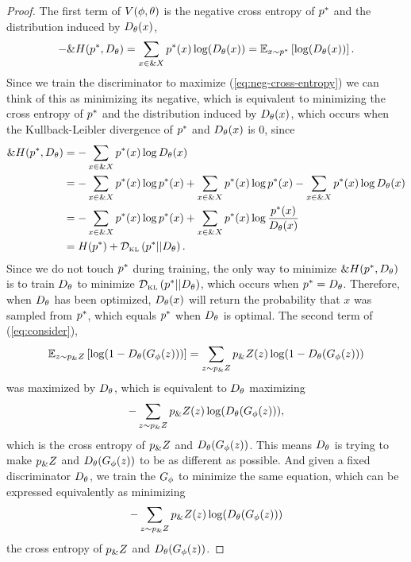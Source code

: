\begin{proof}
  The first term of $V(\phi, \theta)$ is the negative cross entropy of $p^*$ and
  the distribution induced by $D_\theta(x)$,
\begin{align}
  \label{eq:neg-cross-entropy}
  - \&H(p^*, D_\theta) = \sum_{x \in \&X}p^*(x)\log(D_\theta(x)) = \mathbb{E}_{x \sim p^*} \left[\log(D_\theta(x))\right].
\end{align}
Since we train the discriminator to maximize
(\ref{eq:neg-cross-entropy}) we can think of this as minimizing its
negative, which is equivalent to minimizing the cross entropy of $p^*$
and the distribution induced by $D_\theta(x)$, which occurs when the
Kullback-Leibler divergence of $p^*$ and $D_\theta(x)$ is 0, since
\begin{align}
  \&H(p^*,D_\theta) & = - \sum_{x \in \&X} p^*(x) \log D_\theta(x) \\
                   & = -\sum_{x \in \&X} p^*(x) \log p^*(x) + \sum_{x \in \&X} p^*(x) \log p^*(x) - \sum_{x \in \&X} p^*(x) \log D_\theta(x) \\
                   & = -\sum_{x \in \&X} p^*(x) \log p^*(x) + \sum_{x \in \&X} p^*(x) \log {p^*(x)\over
                     D_\theta(x)}  \\
                   & = H(p^*) + \mathcal{D}_{\text{\tiny KL}}\left( p^* \middle| \middle| D_\theta \right).
\end{align}
Since we do not touch $p^*$ during training, the only way to minimize
$\&H(p^*,D_\theta)$ is to train $D_\theta$ to minimize $\mathcal{D}_{\text{\tiny KL}}\left( p^* \middle| \middle| D_\theta \right)$, which occurs when
$p^* = D_\theta$. Therefore, when $D_\theta$ has been optimized, $D_\theta(x)$ will return the
probability that $x$ was sampled from $p^*$, which equals $p^*$ when $D_\theta$ is
optimal. The second term of (\ref{eq:consider}),
\begin{align}
  \mathbb{E}_{z \sim p_\&Z}\left[\log(1 - D_\theta(G_\phi(z)))\right] =
  \sum_{z \sim p_\&Z} p_\&Z(z) \log (1 - D_\theta(G_\phi(z)))
\end{align}
was maximized by $D_\theta$, which is equivalent to $D_\theta$ maximizing
\begin{align}
  -\sum_{z \sim p_\&Z} p_\&Z(z) \log (D_\theta(G_\phi(z))),
\end{align}
which is the cross entropy of $p_\&Z$ and $D_\theta(G_\phi(z))$. This means $D_\theta$ is trying
to make $p_\&Z$ and $D_\theta(G_\phi(z))$ to be as different as possible. And given a fixed
discriminator $D_\theta$, we train the $G_\phi$ to minimize the same equation, which can
be expressed equivalently as minimizing
\begin{align}
  -\sum_{z \sim p_\&Z} p_\&Z(z) \log (D_\theta(G_\phi(z)))
\end{align}
the cross entropy of $p_\&Z$ and $D_\theta(G_\phi(z))$.
\end{proof}

